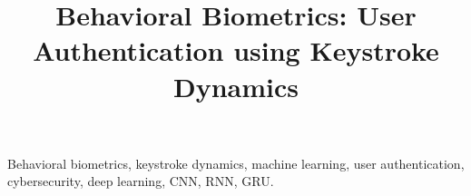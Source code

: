 \documentclass[conference]{IEEEtran}
\begin{document}
\nocite{*}

\title{Behavioral Biometrics: User Authentication using Keystroke Dynamics}

\author{
}

\maketitle

\begin{IEEEkeywords}
Behavioral biometrics, keystroke dynamics, machine learning, user authentication, cybersecurity, deep learning, CNN, RNN, GRU.
\end{IEEEkeywords}



\IEEEpeerreviewmaketitle














\end{document}
